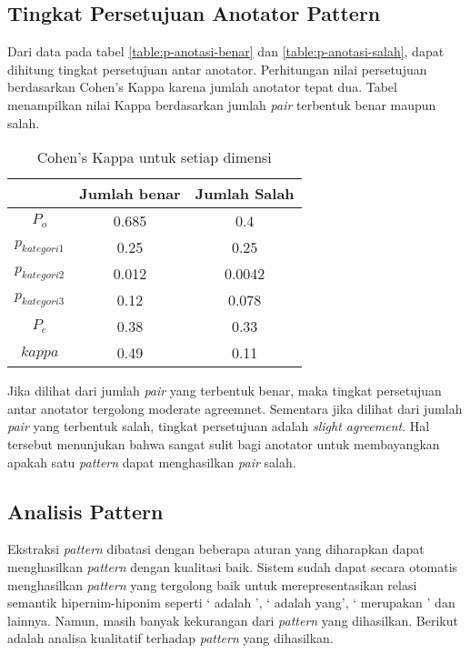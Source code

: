 \subsection{Tingkat Persetujuan Anotator Pattern}
Dari data pada tabel \ref{table:p-anotasi-benar} dan \ref{table:p-anotasi-salah}, dapat dihitung tingkat persetujuan antar anotator. Perhitungan nilai persetujuan berdasarkan Cohen's Kappa karena jumlah anotator tepat dua. Tabel menampilkan nilai Kappa berdasarkan jumlah \textit{pair} terbentuk benar maupun salah.

\begin{table}
  \centering
  \caption{Cohen's Kappa untuk setiap dimensi}
  \label{table:p-kappa}
  \begin{tabular}{|c|c|c|}
  \hline
  & Jumlah benar & Jumlah Salah \\ \hline
  $P_o$ & 0.685 & 0.4 \\ \hline
  $p_{kategori1}$ & 0.25 & 0.25 \\ \hline
  $p_{kategori2}$ & 0.012 & 0.0042 \\ \hline
  $p_{kategori3}$ & 0.12 & 0.078 \\ \hline
  $P_e$ & 0.38 & 0.33 \\ \hline
  $kappa$ & 0.49 & 0.11 \\ \hline 
  \end{tabular} 
\end{table}

Jika dilihat dari jumlah \textit{pair} yang terbentuk benar, maka tingkat persetujuan antar anotator tergolong {moderate agreemnet}. Sementara jika dilihat dari jumlah \textit{pair} yang terbentuk salah, tingkat persetujuan adalah \textit{slight agreement}. Hal tersebut menunjukan bahwa sangat sulit bagi anotator untuk membayangkan apakah satu \textit{pattern} dapat menghasilkan \textit{pair} salah.

\subsection{Analisis Pattern}
Ekstraksi \textit{pattern} dibatasi dengan beberapa aturan yang diharapkan dapat menghasilkan \textit{pattern} dengan kualitasi baik. Sistem sudah dapat secara otomatis menghasilkan \textit{pattern} yang tergolong baik untuk merepresentasikan relasi semantik hipernim-hiponim seperti `{\tagHyponym} adalah {\tagHypernym}', `{\tagHyponym} adalah {\tagHypernym} yang', `{\tagHyponym} merupakan {\tagHypernym}' dan lainnya. Namun, masih banyak kekurangan dari \textit{pattern} yang dihasilkan. Berikut adalah  analisa kualitatif terhadap \textit{pattern} yang dihasilkan.

